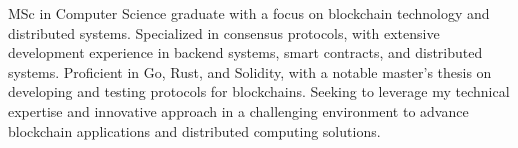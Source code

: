 \documentclass[a4paper,12pt]{article}
\begin{document}
MSc in Computer Science graduate with a focus on blockchain technology and distributed systems. Specialized in consensus protocols, with extensive development experience in backend systems, smart contracts, and distributed systems.
Proficient in Go, Rust, and Solidity, with a notable master's thesis on developing and testing protocols for blockchains. Seeking to leverage my technical expertise and innovative approach in a challenging environment to advance blockchain applications and distributed computing solutions.
\end{document}
